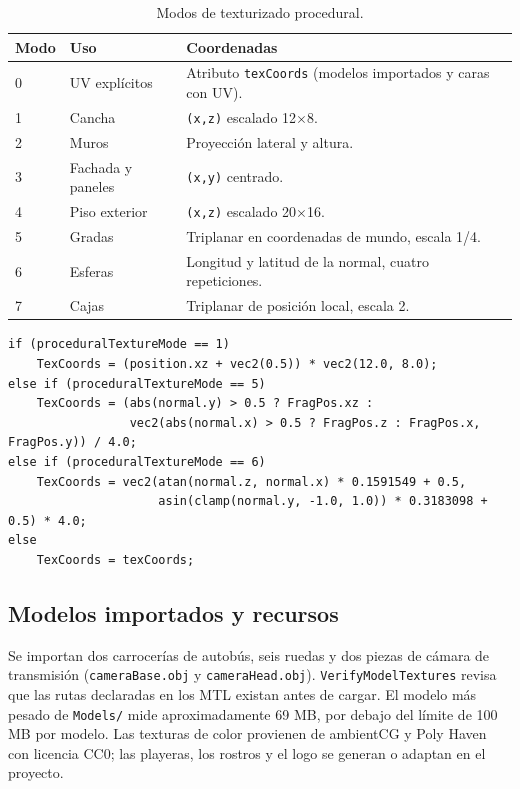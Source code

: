 \documentclass[12pt,letterpaper]{article}
\begin{document}
\begin{table}[H]
\centering
\small
\begin{tabular}{p{}p{}p{}}
\toprule
\textbf{Modo} & \textbf{Uso} & \textbf{Coordenadas}\\
\midrule
0 & UV explícitos & Atributo \texttt{texCoords} (modelos importados y caras con UV).\\
1 & Cancha & \texttt{(x,z)} escalado 12$\times$8.\\
2 & Muros & Proyección lateral y altura.\\
3 & Fachada y paneles & \texttt{(x,y)} centrado.\\
4 & Piso exterior & \texttt{(x,z)} escalado 20$\times$16.\\
5 & Gradas & Triplanar en coordenadas de mundo, escala 1/4.\\
6 & Esferas & Longitud y latitud de la normal, cuatro repeticiones.\\
7 & Cajas & Triplanar de posición local, escala 2.\\
\bottomrule
\end{tabular}
\caption{Modos de texturizado procedural.}\label{tab:modos}
\end{table}

\begin{lstlisting}
if (proceduralTextureMode == 1)
    TexCoords = (position.xz + vec2(0.5)) * vec2(12.0, 8.0);
else if (proceduralTextureMode == 5)
    TexCoords = (abs(normal.y) > 0.5 ? FragPos.xz :
                 vec2(abs(normal.x) > 0.5 ? FragPos.z : FragPos.x, FragPos.y)) / 4.0;
else if (proceduralTextureMode == 6)
    TexCoords = vec2(atan(normal.z, normal.x) * 0.1591549 + 0.5,
                     asin(clamp(normal.y, -1.0, 1.0)) * 0.3183098 + 0.5) * 4.0;
else
    TexCoords = texCoords;
\end{lstlisting}

\subsection{Modelos importados y recursos}
Se importan dos carrocerías de autobús, seis ruedas y dos piezas de cámara de transmisión
(\texttt{cameraBase.obj} y \texttt{cameraHead.obj}). \texttt{VerifyModelTextures} revisa que las
rutas declaradas en los MTL existan antes de cargar. El modelo más pesado de \texttt{Models/} mide
aproximadamente 69 MB, por debajo del límite de 100 MB por modelo. Las texturas de color provienen de
ambientCG y Poly Haven con licencia CC0; las playeras, los rostros y el logo se generan o adaptan en
el proyecto.
\end{document}
